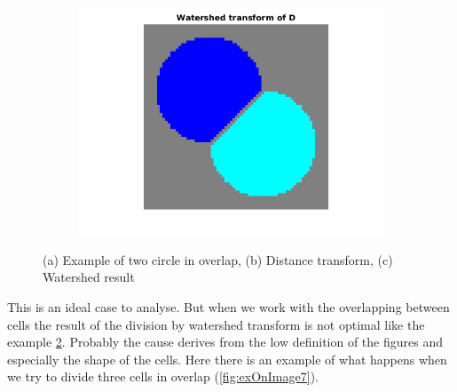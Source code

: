 \begin{figure}[htbp]
\begin{subfigure}[b]{0.5\textwidth}
        \includegraphics[width=\textwidth]{img/watershedEx.png}
        \caption{ }
        \label{fig:overlapwater}
    \end{subfigure}
    \caption{(a) Example of two circle in overlap, (b) Distance transform, (c) Watershed result}\label{fig:stepswater}
\end{figure}
This is an ideal case to analyse. But when we work with the overlapping between cells the result of the division by watershed transform is not optimal like the example \ref{fig:stepswater}. Probably the cause derives from the low definition of the figures and especially the shape of the cells. Here there is an example of what happens when we try to divide three cells in overlap (\ref{fig:exOnImage7}).
